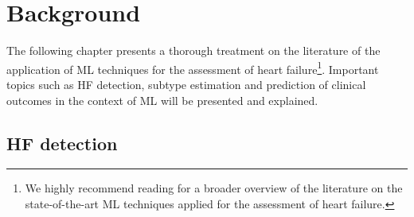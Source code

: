\documentclass[../thesis.tex]{subfiles}
\begin{document}
\chapter{Background}
\label{chap:back}

The following chapter presents a thorough treatment on the literature of the application of ML techniques for the assessment of heart failure\footnote{We highly recommend reading \cite{tripoliti2017heart} for a broader overview of the literature on the state-of-the-art ML techniques applied for the assessment of heart failure.}. Important topics such as HF detection, subtype estimation and prediction of clinical outcomes in the context of ML will be presented and explained.

\section{HF detection}
\label{sec:hfdet}
\end{document}
